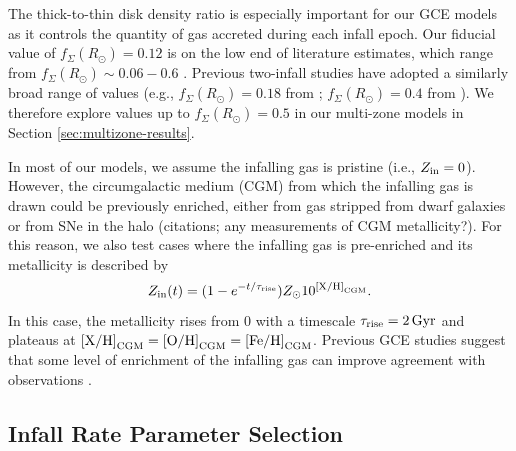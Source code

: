 \documentclass[twocolumn,twocolappendix,linenumbers]{aastex631}
\newcommand{\todo}[1]{{\color{red}#1}}
\newcommand{\mathXH}{{\rm [X/H]}}
\newcommand{\mathOH}{{\rm [O/H]}}
\newcommand{\mathFeH}{{\rm [Fe/H]}}
\newcommand{\mathOFe}{{\rm [O/Fe]}}
\begin{document}
The thick-to-thin disk density ratio is especially important for our GCE models as it controls the quantity of gas accreted during each infall epoch. Our fiducial value of $f_\Sigma(R_\odot)=0.12$ is on the low end of literature estimates, which range from $f_\Sigma(R_\odot)\sim0.06-0.6$ \citep[e.g.,][]{gilmore_new_1983,siegel_star_2002,juric_milky_2008,mackereth_age-metallicity_2017,fuhrmann_local_2017}. Previous two-infall studies have adopted a similarly broad range of values (e.g., $f_\Sigma(R_\odot)=0.18$ from \citealt{spitoni_apogee_2021}; $f_\Sigma(R_\odot)=0.4$ from \citealt{spitoni_remind_2024}). We therefore explore values up to $f_\Sigma(R_\odot)=0.5$ in our multi-zone models in Section \ref{sec:multizone-results}.

In most of our models, we assume the infalling gas is pristine (i.e., $Z_{\rm in}=0$). However, the circumgalactic medium (CGM) from which the infalling gas is drawn could be previously enriched, either from gas stripped from dwarf galaxies or from SNe in the halo \todo{(citations; any measurements of CGM metallicity?)}. For this reason, we also test cases where the infalling gas is pre-enriched and its metallicity is described by
\begin{equation}
    \label{eq:pre-enrichment}
    Z_{\rm in}(t) = (1 - e^{-t/\tau_{\rm rise}}) Z_\odot 10^{\mathXH_{\rm CGM}}.
\end{equation}
In this case, the metallicity rises from 0 with a timescale $\tau_{\rm rise}=2\,{\rm Gyr}$ and plateaus at $\mathXH_{\rm CGM}=\mathOH_{\rm CGM}=\mathFeH_{\rm CGM}$. Previous GCE studies suggest that some level of enrichment of the infalling gas can improve agreement with observations \citep[e.g.,][]{palla_chemical_2020,johnson_milky_2024,spitoni_remind_2024}.

\subsection{Infall Rate Parameter Selection}
\label{sec:parameter-selection}
\end{document}
